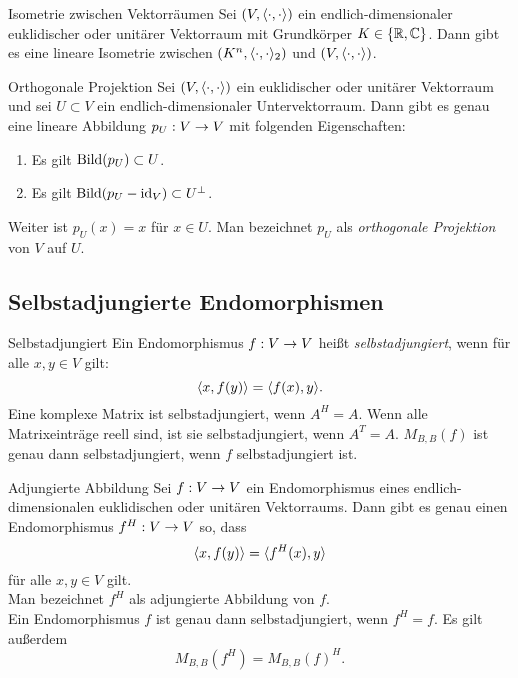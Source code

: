 \documentclass[main.tex]{subfiles}
\begin{document}
\begin{karte}{Isometrie zwischen Vektorräumen}
    Sei \( (V, \langle \cdot, \cdot \rangle) \) ein 
    endlich-dimensionaler euklidischer oder 
    unitärer Vektorraum mit Grundkörper 
    \( K\in \{\mathbb{R}, \mathbb{C}\} \). Dann gibt es eine lineare 
    Isometrie zwischen \( (K^n, \langle \cdot, \cdot \rangle_2) \)
    und \( (V, \langle \cdot, \cdot \rangle) \).
\end{karte}

\begin{karte}{Orthogonale Projektion}
    Sei \( (V,\langle \cdot, \cdot \rangle) \) ein 
    euklidischer oder unitärer Vektorraum und 
    sei \( U \subset V \) ein endlich-dimensionaler 
    Untervektorraum. Dann gibt es genau eine lineare 
    Abbildung \( p_U : V \rightarrow V \) mit folgenden 
    Eigenschaften:
    \begin{enumerate}
        \item Es gilt \(\operatorname{Bild}(p_U) \subset U\).
        \item Es gilt \( \operatorname{Bild}(p_U - \operatorname{id}_V)\subset U^\bot \).
    \end{enumerate}
    Weiter ist \( p_U(x) = x \) für \( x\in U \). Man 
    bezeichnet \( p_U \) als \textit{orthogonale Projektion} 
    von \(V\) auf \(U\).
\end{karte}

\subsection*{Selbstadjungierte Endomorphismen}

\begin{karte}{Selbstadjungiert}
    Ein Endomorphismus \( f : V \rightarrow V \) heißt 
    \textit{selbstadjungiert}, wenn für alle 
    \( x,y\in V \) gilt:
    \[ \langle x, f(y) \rangle = \langle f(x), y \rangle. \]
    Eine komplexe Matrix ist selbstadjungiert, wenn 
    \( A^H = A \). Wenn alle Matrixeinträge reell 
    sind, ist sie selbstadjungiert, wenn \(A^T = A\).
    \( M_{B,B}(f) \) ist genau dann selbstadjungiert, 
    wenn \(f\) selbstadjungiert ist.
\end{karte}

\begin{karte}{Adjungierte Abbildung}
    Sei \( f : V \rightarrow V \) ein Endomorphismus 
    eines endlich-dimensionalen euklidischen oder unitären 
    Vektorraums. Dann gibt es genau einen Endomorphismus 
    \( f^H : V \rightarrow V \) so, dass 
    \[ \langle x, f(y) \rangle = \langle f^H(x), y \rangle \] 
    für alle \( x,y\in V \) gilt. \\
    Man bezeichnet \(f^H\) als adjungierte Abbildung 
    von \(f\).\\
    Ein Endomorphismus \(f\) ist genau dann selbstadjungiert, 
    wenn \(f^H = f\).
    Es gilt außerdem 
    \[ M_{B,B}(f^H) = M_{B, B}(f)^H. \]
\end{karte}
\end{document}
